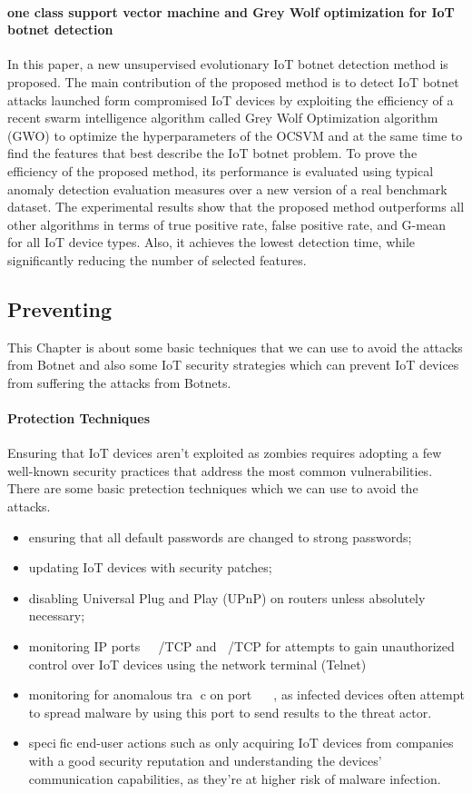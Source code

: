 \documentclass[conference]{IEEEtran}
\begin{document}
\begin{itemize}
\end{itemize}

\paragraph{\textbf{one class support vector
machine and Grey Wolf optimization for IoT botnet detection\cite{b12}}}

In this paper, a new unsupervised evolutionary IoT botnet detection method is proposed. The main contribution of the proposed method is to detect IoT botnet attacks launched form compromised IoT
devices by exploiting the efficiency of a recent swarm intelligence algorithm called Grey Wolf Optimization algorithm
(GWO) to optimize the hyperparameters of the OCSVM and at the same time to find the features that best describe the IoT
botnet problem. To prove the efficiency of the proposed method, its performance is evaluated using typical anomaly detection
evaluation measures over a new version of a real benchmark dataset. The experimental results show that the proposed method
outperforms all other algorithms in terms of true positive rate, false positive rate, and G-mean for all IoT device types. Also,
it achieves the lowest detection time, while significantly reducing the number of selected features\cite{b12}.

\subsection{\textbf{Preventing}}
This Chapter is about some basic techniques that we can use to avoid the attacks from Botnet and also some IoT security strategies which can prevent IoT devices from suffering the attacks from Botnets.
\paragraph{\textbf{Protection Techniques }}
Ensuring that IoT devices aren’t exploited
as zombies requires adopting a
few well-known security practices that
address the most common vulnerabilities. There are some basic pretection techniques which we can use to avoid the attacks.
\begin{itemize}
\item{ensuring that all default passwords
are changed to strong
passwords;}
\item{updating IoT devices with security
patches;}
\item{disabling Universal Plug and
Play (UPnP) on routers unless
absolutely necessary;}
\item{monitoring IP ports /TCP
and /TCP for attempts to gain
unauthorized control over IoT
devices using the network terminal
(Telnet)}
\item{monitoring for anomalous
tra c on port , as infected
devices often attempt to spread malware by using this port to
send results to the threat actor.}
\item{specific end-user actions such as only
acquiring IoT devices from companies
with a good security reputation and
understanding the devices’ communication
capabilities, as they’re at higher
risk of malware infection.}
\end{itemize}
\end{document}
